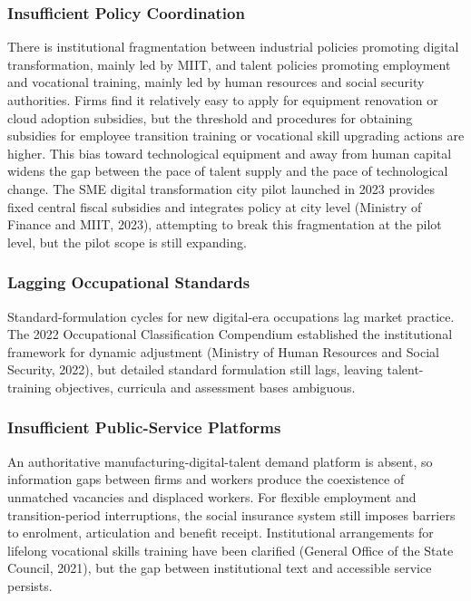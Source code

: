 \documentclass[12pt]{article}
\begin{document}
\subsubsection{Insufficient Policy Coordination}

There is institutional fragmentation between industrial policies promoting digital transformation, mainly led by MIIT, and talent policies promoting employment and vocational training, mainly led by human resources and social security authorities. Firms find it relatively easy to apply for equipment renovation or cloud adoption subsidies, but the threshold and procedures for obtaining subsidies for employee transition training or vocational skill upgrading actions are higher. This bias toward technological equipment and away from human capital widens the gap between the pace of talent supply and the pace of technological change. The SME digital transformation city pilot launched in 2023 provides fixed central fiscal subsidies and integrates policy at city level (Ministry of Finance and MIIT, 2023), attempting to break this fragmentation at the pilot level, but the pilot scope is still expanding.

\subsubsection{Lagging Occupational Standards}

Standard-formulation cycles for new digital-era occupations lag market practice. The 2022 Occupational Classification Compendium established the institutional framework for dynamic adjustment (Ministry of Human Resources and Social Security, 2022), but detailed standard formulation still lags, leaving talent-training objectives, curricula and assessment bases ambiguous.

\subsubsection{Insufficient Public-Service Platforms}

An authoritative manufacturing-digital-talent demand platform is absent, so information gaps between firms and workers produce the coexistence of unmatched vacancies and displaced workers. For flexible employment and transition-period interruptions, the social insurance system still imposes barriers to enrolment, articulation and benefit receipt. Institutional arrangements for lifelong vocational skills training have been clarified (General Office of the State Council, 2021), but the gap between institutional text and accessible service persists.
\end{document}
